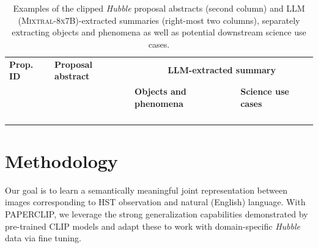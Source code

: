 \documentclass[10pt]{article} %
\newcommand{\hubble}{\emph{Hubble}\xspace}
\begin{document}
\begin{landscape}
  \begin{table}[h!]
    \renewcommand{\arraystretch}{2}
      \centering
      \begin{tabular}{m{1.8cm} m{8cm} m{5cm} m{6.5cm}}
          \toprule
          \bfseries Prop. ID & \centering\arraybackslash \bfseries Proposal abstract & \multicolumn{2}{c}{\bfseries LLM-extracted summary} \tabularnewline
          \cmidrule(r){3-4}
          & & \centering\arraybackslash \bfseries Objects and phenomena & \centering\arraybackslash \bfseries Science use cases \tabularnewline
          \midrule
           & {\scriptsize } & {\scriptsize } & {\scriptsize } \tabularnewline
          \midrule
           & {\scriptsize } & {\scriptsize } & {\scriptsize } \tabularnewline
          \midrule
           & {\scriptsize } & {\scriptsize } & {\scriptsize } \tabularnewline
          \midrule
           & {\scriptsize } & {\scriptsize } & {\scriptsize } \tabularnewline
          \bottomrule
      \end{tabular}
      \caption{Examples of the clipped \hubble proposal abstracts (second column) and LLM (\textsc{Mixtral-8x7B})-extracted summaries (right-most two columns), separately extracting objects and phenomena as well as potential downstream science use cases.}
      \label{tab:datasetsumm}
  \end{table}
  \end{landscape}



\section{Methodology}
\label{sec:methodology}

Our goal is to learn a semantically meaningful joint representation between images corresponding to HST observation and natural (English) language.
%
With PAPERCLIP, we leverage the strong generalization capabilities demonstrated by pre-trained CLIP models and adapt these to work with domain-specific \hubble data via fine tuning.
\end{document}
